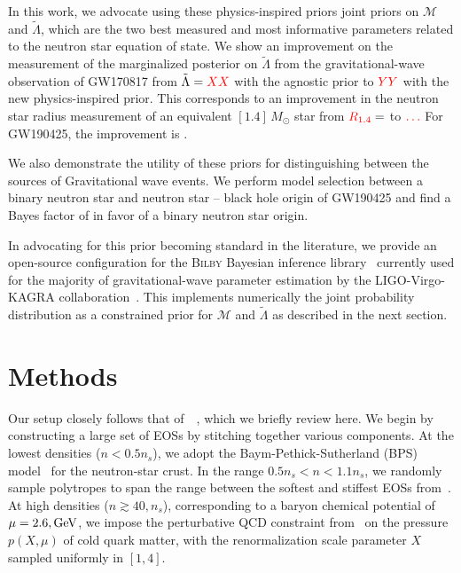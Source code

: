 \documentclass[twocolumn]{aastex631}
\begin{document}
In this work, we advocate using these physics-inspired priors joint
priors on $\mathcal{M}$ and $\tilde{\Lambda}$, which are the two best
measured and most informative parameters related to the neutron star
equation of state. We show an improvement on the measurement of the
marginalized posterior on $\tilde{\Lambda}$ from the gravitational-wave
observation of GW170817 from $\tilde{\Lambda}=\textcolor{red}{XX}$ with the agnostic
prior to $\textcolor{red}{YY}$ with the new physics-inspired prior. This corresponds
to an improvement in the neutron star radius measurement of an equivalent
$[1.4]\,{M_\odot}$ star from $\textcolor{red}{R_{1.4}}= $ to $\textcolor{red}{\ldots}$ For
GW190425, the improvement is \red{\ldots}.
	
	We also demonstrate the utility of these priors for distinguishing between the sources of Gravitational wave events. We perform model selection between a binary neutron star and neutron star -- black hole origin of GW190425 and find a Bayes factor of  in favor of a binary neutron star origin. 
	
	In advocating for this prior becoming standard in the literature, we provide an open-source configuration for the \textsc{Bilby} Bayesian inference library~\citep{ashton19,romeroshaw20} currently used for the majority of gravitational-wave parameter estimation by the LIGO-Virgo-KAGRA collaboration~\citep{LIGO, Virgo, KAGRA}. This implements numerically the joint probability distribution as a constrained prior for $\mathcal{M}$ and $\tilde{\Lambda}$ as described in the next section.
	
	
	\section{Methods} \label{sec:Methods}
	
	
	Our setup closely follows that of~~\citet{Altiparmak:2022}, which we briefly review here. 
	We begin by constructing a large set of EOSs by stitching together various components.
	At the lowest densities ($n<0.5 n_s$), we adopt the Baym-Pethick-Sutherland (BPS) model~\citep{Baym71} for the neutron-star crust.
	In the range $0.5 n_s < n < 1.1 n_s$, we randomly sample polytropes to span the range between the softest and stiffest EOSs from~\citet{Hebeler:2013nza}.
	At high densities ($n \gtrsim 40,n_s$), corresponding to a baryon chemical potential of $\mu = 2.6,{\rm GeV}$, we impose the perturbative QCD constraint from~\citet{Fraga2014} on the pressure $p(X, \mu)$ of cold quark matter, with the renormalization scale parameter $X$ sampled uniformly in $[1,4]$.
	
\end{document}
